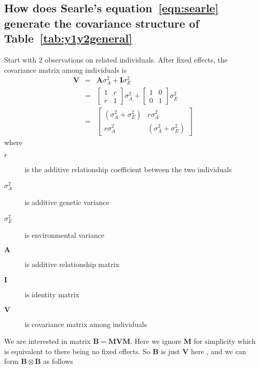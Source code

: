 \documentclass[titlepage]{article}  %
\begin{document}
\subsection{How does Searle's equation~\ref{eqn:searle} generate the covariance structure of Table~\ref{tab:y1y2general}}
  Start with 2 observations on related individuals. After fixed effects, the covariance matrix among individuals is 
\begin{eqnarray}
  \bm{V} & = & \bm{A} \sigma^{2}_{A} + \bm{I} \sigma^{2}_{E} \\
    & = &  \begin{bmatrix} 1 & r \\ r & 1 \end{bmatrix} \sigma^{2}_{A} 
         +  \begin{bmatrix} 1 & 0 \\ 0 & 1 \end{bmatrix} \sigma^{2}_{E} \\ \label{eqn:regv}
    & = & \begin{bmatrix} (\sigma^{2}_{A} + \sigma^{2}_{E}) & r \sigma^{2}_{A} \\ r \sigma^{2}_{A} & (\sigma^{2}_{A} + \sigma^{2}_{E}) \end{bmatrix}
\end{eqnarray}
 where
\begin{description}
\item[$r$] is the additive relationship coefficient between the two individuals
\item[$\sigma^{2}_{A}$] is additive genetic variance
\item[$\sigma^{2}_{E}$] is environmental variance
\item[$\bm{A}$] is additive relationship matrix
\item[$\bm{I}$] is identity matrix 
\item[$\bm{V}$] is covariance matrix among individuals
\end{description}

We are interested in matrix $\bm{B} = \bm{M} \bm{V} \bm{M}$. Here we  ignore $\bm{M}$ for simplicity which is equivalent to there being no fixed effects.  So $\bm{B}$  is just $\bm{V}$ here , and we can form $\bm{B} \otimes \bm{B}$ as follows
\end{document}
